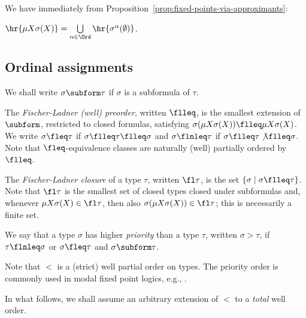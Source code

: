 We have immediately from Proposition~\ref{prop:fixed-points-via-approximants}:
\begin{corollary}
\label{cor:hr-mu-as-limit-of-approximants}
$\hr{\mu X \sigma(X)} = \bigcup\limits_{\alpha \in \Ord} \hr{\sigma^\alpha(\emptyset)}$.
\end{corollary}



\subsection{Ordinal assignments}


We shall write $\sigma \subform \tau$ if $\sigma$ is a subformula of $\tau$.


The \emph{Fischer-Ladner (well) preorder}, written $\flleq$,
is the smallest extension of $\subform$, restricted to closed formulas, satisfying
$\sigma(\mu X \sigma(X)) \flleq \mu X \sigma(X)$.
We write $\sigma \fleq \tau$ if $\sigma \flleq \tau \flleq \sigma$ and $\sigma \flnleq \tau$ if $\sigma \flleq \tau \not\flleq \sigma$.
Note that $\fleq$-equivalence classes are naturally (well) partially ordered by $\flleq$.

The \emph{Fischer-Ladner closure} of a type $\tau$, written $\fl \tau$, is the set $\{\sigma \mid \sigma \flleq \tau\}$.
Note that $\fl \tau$ is the smallest set of closed types closed under subformulas and, whenever $\mu X\sigma(X) \in \fl \tau$, then also $\sigma(\mu X\sigma(X)) \in \fl \tau$; this is necessarily a finite set.

\begin{definition}
[Priority]
We say that a type $\sigma$ has higher \emph{priority} than a type $\tau$, written $\sigma>\tau$, if $\tau \flnleq \sigma$ or $\sigma \fleq \tau $ and $\sigma \subform \tau$.

\end{definition}
Note that $<$ is a (strict) well partial order on types. 
The priority order is commonly used in modal fixed point logics, e.g., \cite{Studer08:mu-calc,Doumane17thesis,venema2008lectures}.

\begin{convention}
In what follows, we shall assume an arbitrary extension of $<$ to a \emph{total} well order.    
\end{convention}




